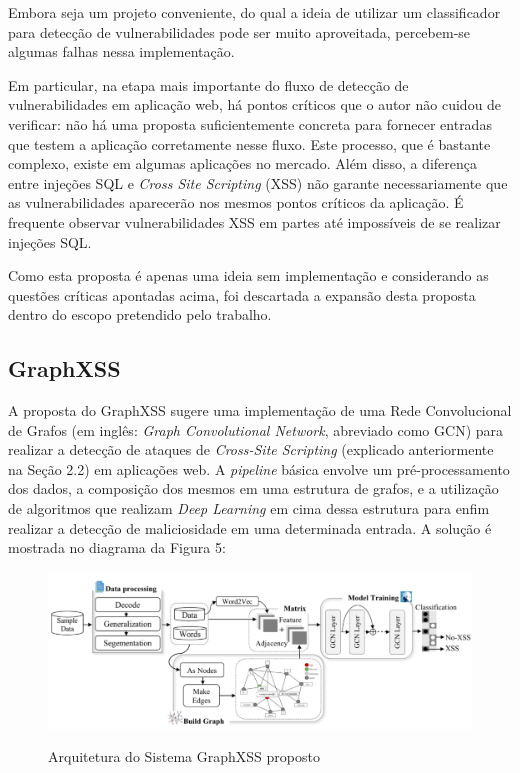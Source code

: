 Embora seja um projeto conveniente, do qual a ideia de utilizar um classificador para detecção de vulnerabilidades pode ser muito aproveitada,  percebem-se algumas falhas nessa implementação. 

Em particular, na etapa mais importante do fluxo de detecção de vulnerabilidades em aplicação web, há pontos críticos que o autor não cuidou de verificar: não há uma proposta suficientemente concreta para fornecer entradas que testem a aplicação corretamente nesse fluxo. Este processo, que é bastante complexo, existe em algumas aplicações no mercado. Além disso, a diferença entre injeções SQL e \textit{Cross Site Scripting} (XSS) não garante necessariamente  que as vulnerabilidades aparecerão nos mesmos pontos críticos da aplicação. É frequente observar vulnerabilidades XSS em partes até impossíveis de se realizar injeções SQL.

Como esta proposta é apenas uma ideia sem implementação e considerando as questões críticas apontadas acima, foi descartada a expansão desta proposta dentro do escopo pretendido pelo trabalho.

\subsection{GraphXSS}
A proposta do GraphXSS \cite{liu_graphxss_2022} sugere uma implementação de uma Rede Convolucional de Grafos (em inglês: \textit{Graph Convolutional Network}, abreviado como GCN) para realizar a detecção de ataques de \textit{Cross-Site Scripting} (explicado anteriormente na Seção 2.2) em aplicações web. A \textit{pipeline} básica envolve um pré-processamento dos dados, a composição dos mesmos em uma estrutura de grafos, e a utilização de algoritmos que realizam \textit{Deep Learning} em cima dessa estrutura para enfim realizar a detecção de maliciosidade em uma determinada entrada. A solução é mostrada no diagrama da Figura 5: 

\begin{figure}[H]
    \centering
    \caption{Arquitetura do Sistema GraphXSS proposto}
    \includegraphics[width=14cm]{figuras/graphXSS.png} 
    \label{fig:internet} 
\end{figure}

